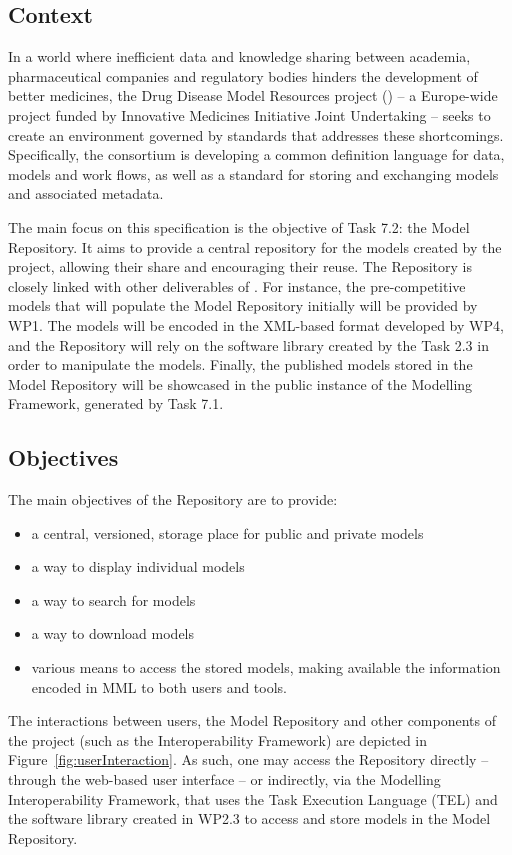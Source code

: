 \subsection{Context}
\label{context}
In a world where inefficient data and knowledge sharing between academia, pharmaceutical companies and regulatory bodies hinders the development of better medicines, the Drug Disease Model Resources project (\ddmore) -- a Europe-wide project funded by Innovative Medicines Initiative Joint Undertaking -- seeks to create an environment governed by standards that addresses these shortcomings. Specifically, the \ddmore consortium is developing a common definition language for data, models and work flows, as well as a standard for storing and exchanging \glspl{model} and associated \gls{metadata}\cite{ddmore:dow}.

The main focus on this specification is the objective of Task 7.2: the \ddmore Model Repository. It aims to provide a central repository for the models created by the project, allowing their share and encouraging their reuse. The Repository is closely linked with other deliverables of \ddmore. For instance, the pre-competitive models that will populate the Model Repository initially will be provided by WP1. The models will be encoded in the XML-based format developed by WP4, and the Repository will rely on the software library created by the Task 2.3 in order to manipulate the models. Finally, the published models stored in the \ddmore Model Repository will be showcased in the public instance of the Modelling Framework, generated by Task 7.1.

\subsection{Objectives}
\label{objectives}
The main objectives of the Repository are to provide:
\begin{itemize}
  \item a central, versioned, storage place for public and private models
  \item a way to display individual models
  \item a way to search for models
  \item a way to download models
  \item various means to access the stored \glspl{model}, making available the information encoded in MML to both users and tools. 
\end{itemize}

The interactions between users, the Model Repository and other components of the project (such as the Interoperability Framework) are depicted in Figure~\ref{fig:userInteraction}. As such, one may access the Repository directly -- through the web-based user interface -- or indirectly, via the Modelling Interoperability Framework, that uses the Task Execution Language (TEL) and the software library created in WP2.3 to access and store models in the \ddmore Model Repository.

